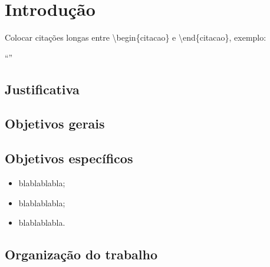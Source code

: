 \chapter{Introdução}

\lipsum[5-10]

Colocar citações longas entre \textbackslash begin\{citacao\} e \textbackslash end\{citacao\}, exemplo: 

\begin{citacao}
``\lipsum[1]''

\cite{REFERENCIA}
\end{citacao}

\section{Justificativa}

\lipsum[1]


\section{Objetivos gerais}

\lipsum[1]

\section{Objetivos específicos}

\begin{itemize}
	\item blablablabla;
    \item blablablabla;
    \item blablablabla.
\end{itemize}

\section{Organização do trabalho}

\lipsum[10-12]
